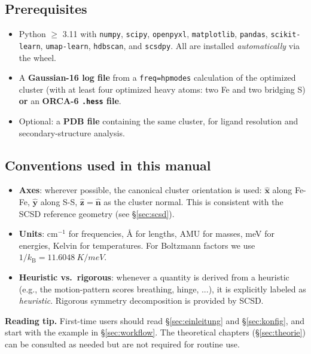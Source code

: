 \documentclass[11pt,a4paper,twoside]{article}
\newcommand{\nhat}{\hat{\mathbf{n}}}
\newcommand{\xhat}{\hat{\mathbf{x}}}
\newcommand{\yhat}{\hat{\mathbf{y}}}
\newcommand{\zhat}{\hat{\mathbf{z}}}
\newcommand{\kB}{k_{\mathrm{B}}}
\theoremstyle{remark}
\begin{document}
\subsection{Prerequisites}

\begin{itemize}
  \item Python $\geq$ 3.11 with \texttt{numpy}, \texttt{scipy},
        \texttt{openpyxl}, \texttt{matplotlib}, \texttt{pandas},
        \texttt{scikit-learn}, \texttt{umap-learn}, \texttt{hdbscan},
        and \texttt{scsdpy}. All are installed
        \emph{automatically} via the wheel.
  \item A \textbf{Gaussian-16 log file} from a
        \texttt{freq=hpmodes} calculation of the optimized cluster
        (with at least four optimized heavy atoms: two Fe and two
        bridging S) \textbf{or} an \textbf{ORCA-6
        \texttt{.hess} file}.
  \item Optional: a \textbf{PDB file} containing the same cluster, for
        ligand resolution and secondary-structure analysis.
\end{itemize}

\subsection{Conventions used in this manual}

\begin{itemize}
  \item \textbf{Axes}: wherever possible, the canonical cluster
        orientation is used:
        $\xhat$ along Fe-Fe, $\yhat$ along S-S,
        $\zhat = \nhat$ as the cluster normal. This is consistent
        with the SCSD reference geometry (see \S\ref{sec:scsd}).
  \item \textbf{Units}: cm$^{-1}$ for frequencies,
        \AA{} for lengths, AMU for masses, meV for energies,
        Kelvin for temperatures. For Boltzmann factors we use
        $1/\kB = \SI{11.6048}{K/meV}$.
  \item \textbf{Heuristic vs.\ rigorous}: whenever a quantity is
        derived from a heuristic (e.g., the
        motion-pattern scores breathing, hinge, ...), it is
        explicitly labeled as \emph{heuristic}. Rigorous
        symmetry decomposition is provided by SCSD.
\end{itemize}

\begin{infobox}
\textbf{Reading tip.} First-time users should read
\S\ref{sec:einleitung} and \S\ref{sec:konfig}, and start with the
example in \S\ref{sec:workflow}. The theoretical chapters
(\S\ref{sec:theorie}) can be consulted as needed but are not required
for routine use.
\end{infobox}
\end{document}
